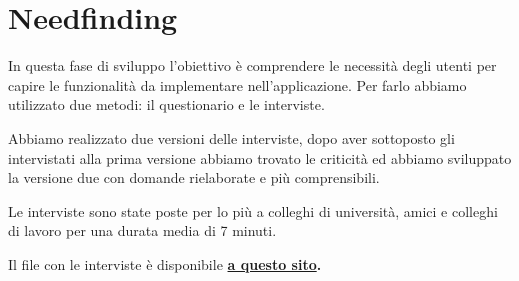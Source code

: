 \documentclass{article}
\begin{document}
\section{Needfinding} 
In questa fase di sviluppo l’obiettivo è comprendere le necessità degli utenti per capire le funzionalità da implementare nell’applicazione. Per farlo abbiamo utilizzato due metodi: il questionario e le interviste.
    \vspace{1cm}
     \par
\par Abbiamo realizzato due versioni delle interviste, dopo aver sottoposto gli intervistati alla prima versione abbiamo trovato le criticità ed abbiamo sviluppato la versione due con domande rielaborate e più comprensibili. \par Le interviste sono state poste per lo più a colleghi di università, amici e colleghi di lavoro per una durata media di 7 minuti.\par
\par Il file con le interviste è disponibile \textbf{\href{https://wind-blob-6b0.notion.site/Interviste-de02a85b8b634f7687534d2064010b4a}{a questo sito}.}\par
  \vspace{1cm}\par
\end{document}
